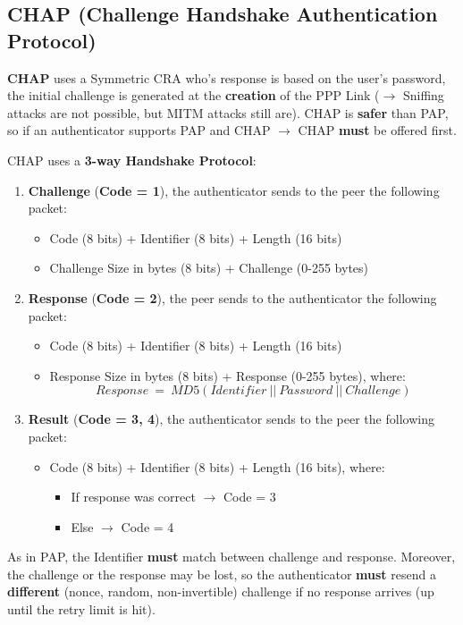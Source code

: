 \subsection{CHAP (Challenge Handshake Authentication Protocol)}
\textbf{CHAP} uses a Symmetric CRA who’s response is based on the user’s password, the initial challenge is generated at the \textbf{creation} of the PPP Link (\(\rightarrow \) Sniffing attacks are not possible, but MITM attacks still are). CHAP is \textbf{safer} than PAP, so if an authenticator supports PAP and CHAP \(\rightarrow \) CHAP \textbf{must} be offered first.
\vspace{-0.4cm}
\begin{center}
\begin{quotebox-grey}{CHAP uses a \textbf{3-way Handshake Protocol}:}
    \begin{enumerate}
        \item \textbf{Challenge} (\textbf{Code = 1}), the authenticator sends to the peer the following packet:
        \begin{itemize}
            \item Code (8 bits) + Identifier (8 bits) + Length (16 bits)
            \item Challenge Size in bytes (8 bits) + Challenge (0-255 bytes)
        \end{itemize}
        \item \textbf{Response} (\textbf{Code = 2}), the peer sends to the authenticator the following packet:
        \begin{itemize}
            \item Code (8 bits) + Identifier (8 bits) + Length (16 bits)
            \item Response Size in bytes (8 bits) + Response (0-255 bytes), where:
            \[Response\ =\ MD5(Identifier\ ||\ Password\ ||\ Challenge)\]
        \end{itemize}
        \item \textbf{Result} (\textbf{Code = 3, 4}), the authenticator sends to the peer the following packet:
        \begin{itemize}
            \item Code (8 bits) + Identifier (8 bits) + Length (16 bits), where:
            \begin{itemize}
                \item If response was correct \(\rightarrow \) Code = 3
                \item Else \(\rightarrow \) Code = 4
            \end{itemize}
        \end{itemize}
    \end{enumerate}
\end{quotebox-grey}
\end{center}
\noindent
As in PAP, the Identifier \textbf{must} match between challenge and response. Moreover, the challenge or the response may be lost, so the authenticator \textbf{must} resend a \textbf{different} (nonce, random, non-invertible) challenge if no response arrives (up until the retry limit is hit).

